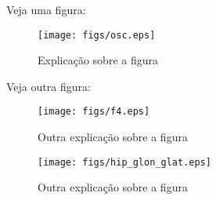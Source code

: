 \documentclass[11pt]{article}
\begin{document}
Veja uma figura:

\begin{figure}[h!]
    \caption{Explicação sobre a figura}
    \centering
    \texttt{[image: figs/osc.eps]}
\end{figure}

Veja outra figura:

\begin{figure}[h!]
    \caption{Outra explicação sobre a figura}
    \centering
    \texttt{[image: figs/f4.eps]}
\end{figure}

\begin{figure}[h!]
    \caption{Outra explicação sobre a figura}
    \centering
    \texttt{[image: figs/hip\_glon\_glat.eps]}
\end{figure}
\end{document}
